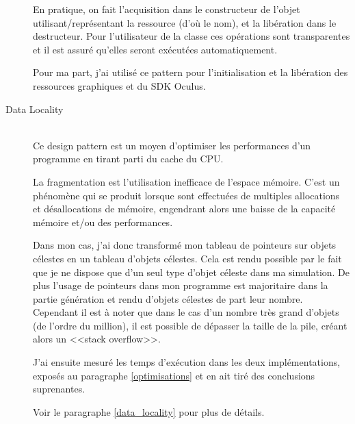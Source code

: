 \documentclass[a4paper,french,12pt]{article}
\begin{document}
\begin{description}
	      En pratique, on fait l'acquisition dans le constructeur de l'objet utilisant/représentant la ressource (d'où le nom), et 
	      la libération dans le destructeur. Pour l'utilisateur de la classe ces opérations sont transparentes et il est
	      assuré qu'elles seront exécutées automatiquement.
	      
	      
	      Pour ma part, j'ai utilisé ce pattern pour l'initialisation et la libération des ressources graphiques et
	      du SDK Oculus.
	    
	    \item [Data Locality]~\\
	      
	      Ce design pattern est un moyen d'optimiser les performances d'un programme en tirant parti du cache du CPU.
	      	      
	      La fragmentation est l'utilisation inefficace de l'espace mémoire. C'est un phénomène qui se produit lorsque 
	      sont effectuées de multiples allocations et
	      désallocations de mémoire, engendrant alors une baisse de la capacité mémoire et/ou des performances.

	      Dans mon cas, j'ai donc transformé mon tableau de pointeurs sur objets célestes en un tableau d'objets célestes.
	      Cela est rendu possible par le fait que je ne dispose que d'un seul type d'objet céleste dans ma simulation.
	      De plus l'usage de pointeurs dans mon programme est majoritaire dans la partie génération et rendu d'objets célestes
	      de part leur nombre.
	      Cependant il est à noter que dans le cas d'un nombre très grand d'objets (de l'ordre du million), il est possible de dépasser
	      la taille de la pile, créant alors un <<stack overflow>>.
	      
	      J'ai ensuite mesuré les temps d'exécution dans les deux implémentations, exposés au paragraphe \ref{optimisations}
	      et en ait tiré des conclusions suprenantes.
	      
	      Voir le paragraphe \ref{data_locality} pour plus de détails.
	    
	    \end{description}
	
\end{document}
